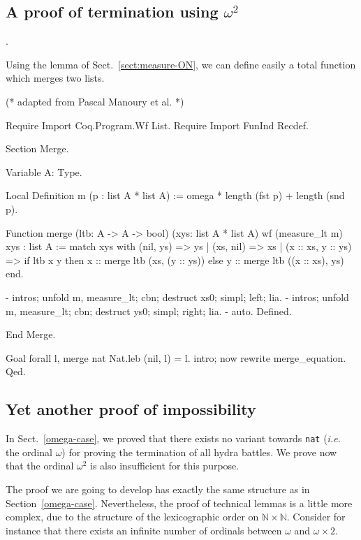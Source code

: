 \documentclass[a4paper]{book}
\begin{document}
\subsection{A proof of termination using \texorpdfstring{$\omega^2$}{omega^2}} 
\label{sect:merge-example}.

Using the lemma of Sect.~\vref{sect:measure-ON}, we can define easily a total function which merges two lists.


\begin{Coqsrc}
(* adapted from Pascal Manoury et al. *)


Require Import Coq.Program.Wf List.
Require Import FunInd Recdef.

Section Merge.

  Variable A: Type.

  Local Definition m (p : list A * list A) :=
    omega * length (fst p) + length (snd p).

  Function  merge  (ltb: A -> A -> bool)
          (xys: list A * list A)
          {wf (measure_lt m) xys} :
    list A :=
    match xys with
      (nil, ys) => ys
    | (xs, nil) => xs
    | (x :: xs, y :: ys) =>
      if ltb x y then x :: merge  ltb (xs, (y :: ys))
      else y :: merge  ltb ((x :: xs), ys)
    end.

  - intros; unfold m, measure_lt; cbn; destruct xs0; simpl; left; lia.
  - intros; unfold m, measure_lt; cbn; destruct ys0; simpl; right; lia.
   - auto.
  Defined.

End Merge.

Goal forall l, merge nat Nat.leb (nil, l) = l.
  intro; now rewrite merge_equation.
Qed.
\end{Coqsrc}
 

\subsection{Yet another  proof of impossibility}
\label{omega2-case}

In Sect.~\vref{omega-case}, we proved that there exists no variant towards \texttt{nat}
(\emph{i.e.} the ordinal $\omega$) for proving the termination of all hydra battles.
We  prove now that  the ordinal $\omega^2$ is also insufficient for this purpose. 

The proof we are going to develop has exactly the same structure as in Section~\ref{omega-case}.
 Nevertheless, the proof of technical  lemmas is a little more complex, due to 
 the structure of the lexicographic order on $\mathbb{N}\times\mathbb{N}$. 
Consider for instance that there exists an infinite number of ordinals  between
$\omega$ and $\omega\times 2$.
\end{document}
